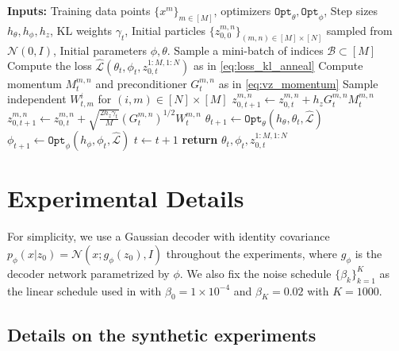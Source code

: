 \begin{algorithm}[htbp]
\caption{IPLD with adaptive Langevin dynamics}\label{algo:train_1}
\begin{algorithmic}[1]
\State \textbf{Inputs:} Training data points $\{ x^m\}_{m\in [M]}$,   optimizers $\texttt{Opt}_{\theta}, \texttt{Opt}_{\phi}$, Step sizes $h_\theta, h_\phi, h_z$, KL weights $\gamma_t$, Initial particles $\{z_{0,0}^{m,n}\}_{(m,n) \in [M] \times [N]}$ sampled from $\mathcal{N}(0,I)$, Initial parameters $\phi,\theta$.
    \State Sample a mini-batch of indices $\mathcal{B}\subset [M]$
    \State Compute the loss $\hat{\mathcal{L}}(\theta_t,\phi_t,z^{1:M,1:N}_{0,t})$ as in \eqref{eq:loss_kl_anneal}
	\State Compute momentum $M_{t}^{m,n}$ and preconditioner $G_{t}^{m,n}$ as in \eqref{eq:vz_momentum}
        \State Sample independent $W_{t,m}^i$ for $(i,m)\in [N]\times[M]$
	\State $z_{0,t+1}^{m,n} \gets z_{0,t}^{m,n} + h_z G_{t}^{m,n} M_{t}^{m,n}$ 
    \EndIf
    \State $z_{0,t+1}^{m,n} \gets z_{0,t}^{m,n} +\sqrt{\frac{2h_z \gamma_t}{M}} (G_{t}^{m,n})^{1/2}W_{t}^{m,n}$ 
    \EndFor
    \State $\theta_{t+1} \gets \texttt{Opt}_\theta(h_\theta, \theta_t, \hat{\mathcal{L}})$
    \State $\phi_{t+1} \gets \texttt{Opt}_\phi(h_\phi, \phi_t, \hat{\mathcal{L}})$
    \State $t \gets t+1$
\EndWhile
\State \textbf{return} $\theta_{t}, \phi_t, z_{0,t}^{1:M,1:N}$
\end{algorithmic}
\end{algorithm}



\section{Experimental Details}
\label{app:implementaion}
For simplicity, we use a Gaussian decoder with identity covariance $p_\phi(x|z_0)=\mathcal{N}(x; g_\phi(z_0), I)$ throughout the experiments, where $g_\phi$ is the decoder network parametrized by $\phi$. We also fix the noise schedule $\{\beta_k\}_{k=1}^{K}$ as the linear schedule used in \citet{hodenoisingdiffusionprobabilistic2020} with $\beta_0=1\times 10^{-4}$ and $\beta_K =0.02$ with $K=1000$.

\subsection{Details on the synthetic experiments}\label{app:synth}
